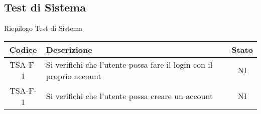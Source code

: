 	\subsection{Test di Sistema}
		\begin{center}
		Riepilogo Test di Sistema
			\begin{longtable}{|c|p{10cm}|c|}
			\hline
			\rowcolor{lighter-grayer}
			\textbf{Codice} & \textbf{Descrizione} & \textbf{Stato}  \\ %

			\hline
			\endhead

	
			\hline
			 TSA-F-1 & Si verifichi che l'utente possa fare il login con il proprio account & NI \\
			 \hline
			 TSA-F-1 & Si verifichi che l'utente possa creare un account & NI \\
			 \hline
			 

\end{longtable}
\end{center}
